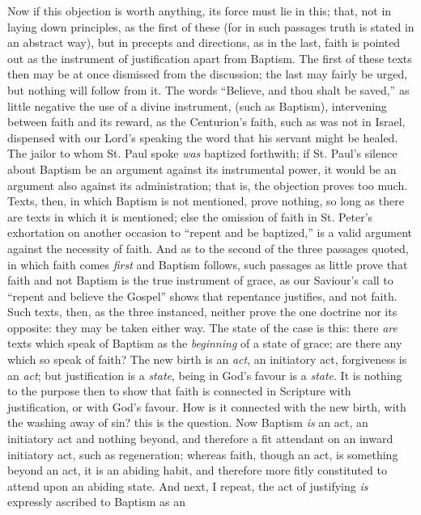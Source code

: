 Now if this objection is worth anything, its force must lie in
this; that, not in laying down principles, as the first of these (for
in such passages truth is stated in an abstract way), but in precepts
and directions, as in the last, faith is pointed out as the instrument
of justification apart from Baptism. The first of these texts then may
be at once dismissed from the discussion; the last may fairly be
urged, but nothing will follow from it. The words ``Believe, and
thou shalt be saved,'' as little negative the use of a divine
instrument, (such as Baptism), intervening between faith and its
reward, as the Centurion's faith, such as was not in Israel, dispensed
with our Lord's speaking the word that his servant might be healed.
The jailor to whom St. Paul spoke \emph{was} baptized forthwith; if St.
Paul's silence about Baptism be an argument against its instrumental
power, it would be an argument also against its administration; that
is, the objection proves too much. Texts, then, in which Baptism is
not mentioned, prove nothing, so long as there are texts in which it
is mentioned; else the omission of faith in St. Peter's exhortation on
another occasion to ``repent and be baptized,'' is a valid
argument against the necessity of faith. And as to the second of the
three passages quoted, in which faith comes \emph{first} and Baptism
follows, such passages as little prove that faith and not Baptism is
the true instrument of grace, as our Saviour's call to ``repent
and believe the Gospel'' shows that repentance justifies, and not
faith. Such texts, then, as the three instanced, neither prove the one
doctrine nor its opposite: they may be taken either way. The state of
the case is this: there \emph{are} texts which speak of Baptism as the \emph{beginning}
of a state of grace; are there any which so speak of faith? The
new birth is an \emph{act}, an initiatory act, forgiveness is an \emph{act};
but justification is a \emph{state}, being in God's favour is a \emph{state}.
It is nothing to the purpose then to show that faith is connected in
Scripture with justification, or with God's favour. How is it
connected with the new birth, with the washing away of sin? this is
the question. Now Baptism \emph{is} an act, an initiatory act and
nothing beyond, and therefore a fit attendant on an inward initiatory
act, such as regeneration; whereas faith, though an act, is something
beyond an act, it is an abiding habit, and therefore more fitly
constituted to attend upon an abiding state. And next, I repeat, the
act of justifying \emph{is} expressly ascribed to Baptism as an
